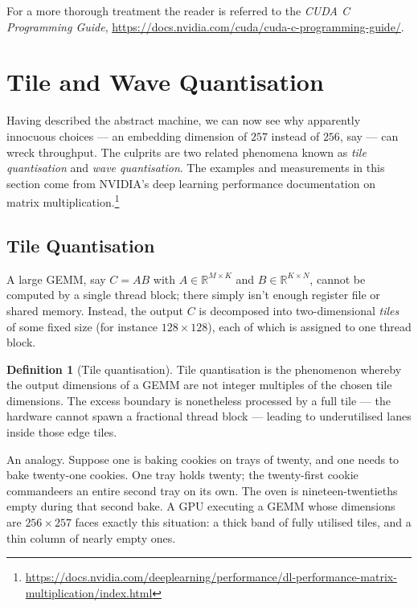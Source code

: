 \documentclass[11pt,a4paper]{article}
\theoremstyle{definition}
\newtheorem{definition}{Definition}[section]
\theoremstyle{remark}
\theoremstyle{plain}
\begin{document}
For a more thorough treatment the reader is referred to the
\textit{CUDA C Programming Guide},
\url{https://docs.nvidia.com/cuda/cuda-c-programming-guide/}.

\section{Tile and Wave Quantisation}

Having described the abstract machine, we can now see why
apparently innocuous choices --- an embedding dimension of $257$
instead of $256$, say --- can wreck throughput. The culprits are
two related phenomena known as \emph{tile quantisation} and
\emph{wave quantisation}. The examples and measurements in this
section come from NVIDIA's deep learning performance documentation on
matrix multiplication.\footnote{%
\url{https://docs.nvidia.com/deeplearning/performance/dl-performance-matrix-multiplication/index.html}}

\subsection{Tile Quantisation}

A large GEMM, say $C = A B$ with $A \in \mathbb{R}^{M \times K}$ and
$B \in \mathbb{R}^{K \times N}$, cannot be computed by a single
thread block; there simply isn't enough register file or shared
memory. Instead, the output $C$ is decomposed into two-dimensional
\emph{tiles} of some fixed size (for instance $128 \times 128$), each
of which is assigned to one thread block.

\begin{definition}[Tile quantisation]
Tile quantisation is the phenomenon whereby the output dimensions of
a GEMM are not integer multiples of the chosen tile dimensions. The
excess boundary is nonetheless processed by a full tile --- the
hardware cannot spawn a fractional thread block --- leading to
underutilised lanes inside those edge tiles.
\end{definition}

An analogy. Suppose one is baking cookies on trays of twenty, and one
needs to bake twenty-one cookies. One tray holds twenty; the
twenty-first cookie commandeers an entire second tray on its own.
The oven is nineteen-twentieths empty during that second bake. A GPU
executing a GEMM whose dimensions are $256 \times 257$ faces exactly
this situation: a thick band of fully utilised tiles, and a thin
column of nearly empty ones.
\end{document}
